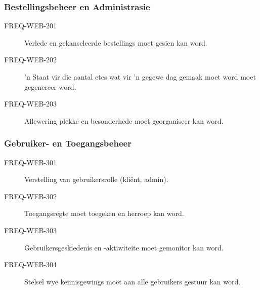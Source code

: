 \subsubsection{Bestellingsbeheer en Administrasie}
\begin{description}  \item[FREQ-WEB-201] Verlede en gekanseleerde bestellings moet gesien kan word.
  \item[FREQ-WEB-202] 'n Staat vir die aantal etes wat vir 'n gegewe dag gemaak moet word moet gegenereer word.
  \item[FREQ-WEB-203] Aflewering plekke en besonderhede moet georganiseer kan word.
\end{description}

\subsubsection{Gebruiker- en Toegangsbeheer}
\begin{description}
  \item[FREQ-WEB-301] Verstelling van gebruikersrolle (kliënt, admin).  \item[FREQ-WEB-302] Toegangsregte moet toegeken en herroep kan word.
  \item[FREQ-WEB-303] Gebruikersgeskiedenis en -aktiwiteite moet gemonitor kan word.
  \item[FREQ-WEB-304] Stelsel wye kennisgewings moet aan alle gebruikers gestuur kan word.
\end{description}


